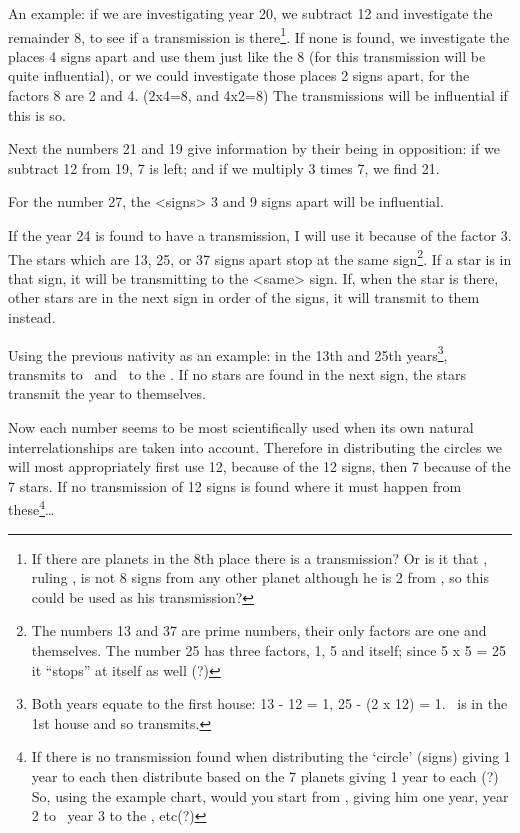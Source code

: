 An example: if we are investigating year 20, we subtract 12 and investigate the remainder 8, to see if a transmission is there\footnote{If there are planets in the 8th place there is a transmission? Or is it that \Mars, ruling \Aries, is not 8 signs from any other planet although he is 2 from \Jupiter, so this could be used as his transmission?}. If none is found, we investigate the places 4 signs apart and use them just like the 8 (for this transmission will be quite influential), or we could investigate those places 2 signs apart, for the factors 8 are 2 and 4. (2x4=8, and 4x2=8) The transmissions will be influential if this is so.

Next the numbers 21 and 19 give information by their being in opposition: if we subtract 12 from 19, 7 is left; and if we multiply 3 times 7, we find 21. 

For the number 27, the <signs> 3 and 9 signs apart will be influential. 

If the year 24 is found to have a transmission, I will use it because of the factor 3. The stars which are 13, 25, or 37 signs apart stop at the same sign\footnote{The numbers 13 and 37 are prime numbers, their only factors are one and themselves. The number 25 has three factors, 1, 5 and itself; since 5 x 5 = 25 it ``stops'' at itself as well (?)}. If a star is in that sign, it will be transmitting to the <same> sign. If, when the star is there, other stars are in the next sign in order of the signs, it will transmit to them instead. 

Using the previous nativity as an example: in the 13th and 25th
years\footnote{Both years equate to the first house: 13 - 12 = 1, 25 - (2 x 12) = 1. \Mars\, is in the 1st house and so transmits.}, \Mars\, transmits to \Jupiter\, and \Jupiter\, to the \Moon. If no stars are found in the next sign, the stars transmit the year to themselves. 

Now each number seems to be most scientifically used when its own natural interrelationships are taken into account. Therefore in distributing the circles we will most appropriately first use 12, because of the 12 signs, then 7 because of the 7 stars. If no transmission of 12 signs is found where it must happen from these\footnote{If there is no transmission found when distributing the `circle' (signs) giving 1 year to each then distribute based on the 7 planets giving 1 year to each (?) So, using the example chart, would you start from \Mars, giving him one year, year 2 to \Jupiter\, year 3 to the \Moon, etc(?)}…

